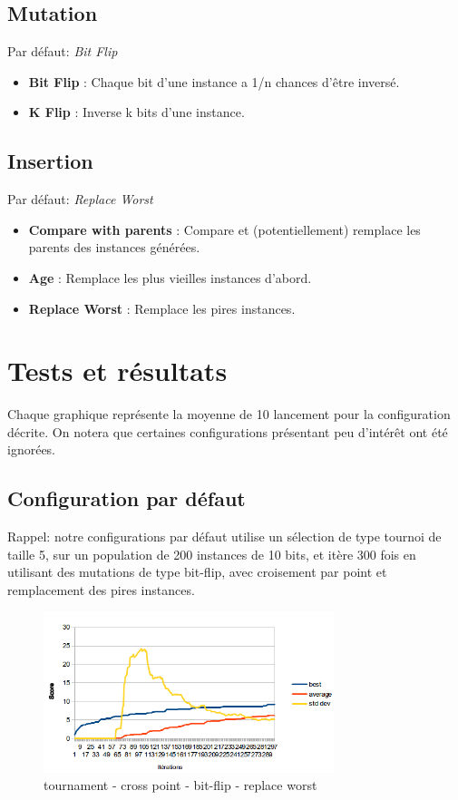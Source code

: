 \documentclass[a4paper,10pt]{report}
\begin{document}
\subsection{Mutation}
Par défaut: \textit{Bit Flip}
\begin{itemize}
   \item \textbf{Bit Flip} : Chaque bit d'une instance a 1/n chances d'être inversé.
   \item \textbf{K Flip} : Inverse k bits d'une instance.
\end{itemize}


\subsection{Insertion}
Par défaut: \textit{Replace Worst}
\begin{itemize}
  \item \textbf{Compare with parents} : Compare et (potentiellement) remplace les parents des instances générées.
  \item \textbf{Age} : Remplace les plus vieilles instances d'abord.
  \item \textbf{Replace Worst} : Remplace les pires instances.
\end{itemize}


\pagebreak
\section{Tests et résultats}
Chaque graphique représente la moyenne de 10 lancement pour la configuration décrite.
On notera que certaines configurations présentant peu d'intérêt ont été ignorées.

\subsection{Configuration par défaut}
Rappel: notre configurations par défaut utilise un sélection de type tournoi de taille 5, sur un population
de 200 instances de 10 bits, et itère 300 fois en utilisant des mutations de type bit-flip, avec croisement par
point et remplacement des pires instances.

\begin{figure}[h]
  \begin{center}
    \includegraphics[width=320px]{images/graph-default.png}
  \end{center}
  \caption{tournament - cross point - bit-flip - replace worst}
\end{figure}
\end{document}

